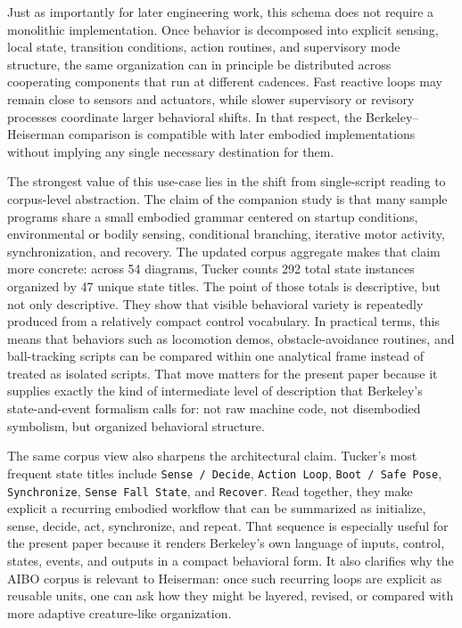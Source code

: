 \documentclass[11pt]{article}
\begin{document}
Just as importantly for later engineering work, this schema does not require a monolithic implementation. Once behavior is decomposed into explicit sensing, local state, transition conditions, action routines, and supervisory mode structure, the same organization can in principle be distributed across cooperating components that run at different cadences. Fast reactive loops may remain close to sensors and actuators, while slower supervisory or revisory processes coordinate larger behavioral shifts. In that respect, the Berkeley--Heiserman comparison is compatible with later embodied implementations without implying any single necessary destination for them.

The strongest value of this use-case lies in the shift from single-script reading to corpus-level abstraction. The claim of the companion study is that many sample programs share a small embodied grammar centered on startup conditions, environmental or bodily sensing, conditional branching, iterative motor activity, synchronization, and recovery. The updated corpus aggregate makes that claim more concrete: across 54 diagrams, Tucker counts 292 total state instances organized by 47 unique state titles. The point of those totals is descriptive, but not only descriptive. They show that visible behavioral variety is repeatedly produced from a relatively compact control vocabulary. In practical terms, this means that behaviors such as locomotion demos, obstacle-avoidance routines, and ball-tracking scripts can be compared within one analytical frame instead of treated as isolated scripts. That move matters for the present paper because it supplies exactly the kind of intermediate level of description that Berkeley's state-and-event formalism calls for: not raw machine code, not disembodied symbolism, but organized behavioral structure.

The same corpus view also sharpens the architectural claim. Tucker's most frequent state titles include \texttt{Sense / Decide}, \texttt{Action Loop}, \texttt{Boot / Safe Pose}, \texttt{Synchronize}, \texttt{Sense Fall State}, and \texttt{Recover}. Read together, they make explicit a recurring embodied workflow that can be summarized as initialize, sense, decide, act, synchronize, and repeat. That sequence is especially useful for the present paper because it renders Berkeley's own language of inputs, control, states, events, and outputs in a compact behavioral form. It also clarifies why the AIBO corpus is relevant to Heiserman: once such recurring loops are explicit as reusable units, one can ask how they might be layered, revised, or compared with more adaptive creature-like organization.
\end{document}
